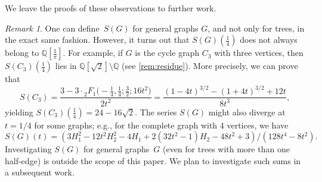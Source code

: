 \documentclass[12pt]{amsart}
\theoremstyle{plain}
\theoremstyle{remark}
\newtheorem{remark}[lemma]{Remark}
\def\Q{\mathbb{Q}}
\def\Q{\mathbb{Q}}
\begin{document}
We leave the proofs of these observations to further work.
	
\begin{remark}\label{rem:triangle}
One can define~$S(G)$ for general graphs $G$, and not only for trees,
in the exact same fashion.
However, it turns out that $S ( G )(\frac{1}{4})$ does not always belong to $\Q[\tfrac1{\pi}]$.
For example, if $G$ is the cycle graph $C_3$ with three vertices, then $S ( C_3 )(\frac{1}{4})$ lies in $\Q[\sqrt 2] \setminus \Q$ (see \cref{rem:residue}). 
More precisely, we can prove that
\begin{equation}\label{eq:SC3}
S(C_3)
=
\frac{ 3- 3 \cdot {}_{2}^{}{{}{{}{F_{1}^{}}}}\big(-\tfrac14, \tfrac14; \tfrac32;16t^2\big)}{2 t^{2}}
=
\frac{(1-4t)^{3/2} - (1+4t)^{3/2} + 12t}{8t^3},
\end{equation}
yielding $S ( C_3 )(\frac{1}{4}) = 24-16\sqrt{2}$.
The series $S(G)$ might also diverge at $t=1/4$ for some graphs; e.g., for the complete graph with 4 vertices, we have 
\[S(G)(t)= (3 H_1^2 - 12t^2 H_2^2 - 4H_1 + 2(32t^2 - 1)H_2 - 48t^2 + 3)/(128t^4 - 8t^2) . \]
Investigating $S(G)$ for general graphs~$G$ (even for trees with
more than one half-edge) is outside the scope of this paper. We plan to investigate such sums in a subsequent work.
\end{remark}
	
\end{document}
